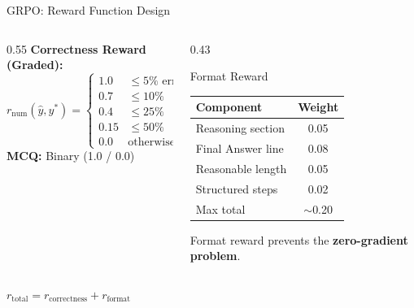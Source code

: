 \documentclass[10pt]{beamer}
\begin{document}
\begin{frame}{GRPO: Reward Function Design}
\large
\begin{columns}[t]
    \begin{column}{0.55\linewidth}
        \textbf{Correctness Reward (Graded):}
        \[
            r_{\text{num}}(\hat{y}, y^*) = \begin{cases}
                1.0 & \leq 5\% \text{ error} \\
                0.7 & \leq 10\% \\
                0.4 & \leq 25\% \\
                0.15 & \leq 50\% \\
                0.0 & \text{otherwise}
            \end{cases}
        \]
        \vspace{0.2cm}
        \textbf{MCQ:} Binary (1.0 / 0.0)
    \end{column}
    \begin{column}{0.43\linewidth}
        \begin{block}{Format Reward}
            \footnotesize
            \begin{tabular}{lc}
                \toprule
                Component & Weight \\
                \midrule
                Reasoning section & 0.05 \\
                Final Answer line & 0.08 \\
                Reasonable length & 0.05 \\
                Structured steps & 0.02 \\
                \midrule
                Max total & $\sim$0.20 \\
                \bottomrule
            \end{tabular}
        \end{block}
        \vspace{0.1cm}
        {\footnotesize Format reward prevents the \textbf{zero-gradient problem}.}
    \end{column}
\end{columns}

\vspace{0.3cm}
\centering
$r_{\text{total}} = r_{\text{correctness}} + r_{\text{format}}$
\end{frame}
\end{document}

